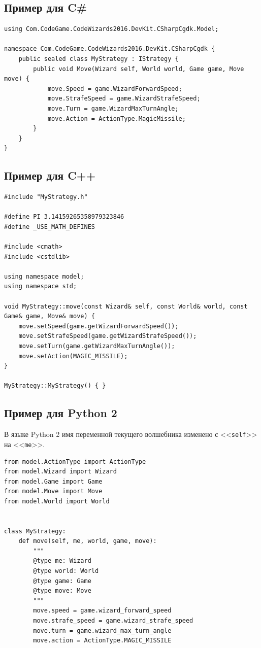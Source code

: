 \subsection{Пример для C\#}

\begin{verbatim}
using Com.CodeGame.CodeWizards2016.DevKit.CSharpCgdk.Model;

namespace Com.CodeGame.CodeWizards2016.DevKit.CSharpCgdk {
    public sealed class MyStrategy : IStrategy {
        public void Move(Wizard self, World world, Game game, Move move) {
            move.Speed = game.WizardForwardSpeed;
            move.StrafeSpeed = game.WizardStrafeSpeed;
            move.Turn = game.WizardMaxTurnAngle;
            move.Action = ActionType.MagicMissile;
        }
    }
}
\end{verbatim}

\newpage
\subsection{Пример для C++}

\begin{verbatim}
#include "MyStrategy.h"

#define PI 3.14159265358979323846
#define _USE_MATH_DEFINES

#include <cmath>
#include <cstdlib>

using namespace model;
using namespace std;

void MyStrategy::move(const Wizard& self, const World& world, const Game& game, Move& move) {
    move.setSpeed(game.getWizardForwardSpeed());
    move.setStrafeSpeed(game.getWizardStrafeSpeed());
    move.setTurn(game.getWizardMaxTurnAngle());
    move.setAction(MAGIC_MISSILE);
}

MyStrategy::MyStrategy() { }
\end{verbatim}

\newpage
\subsection{Пример для Python 2}

В языке Python 2 имя переменной текущего волшебника изменено с <<\texttt{self}>> на <<\texttt{me}>>.

\begin{verbatim}
from model.ActionType import ActionType
from model.Wizard import Wizard
from model.Game import Game
from model.Move import Move
from model.World import World


class MyStrategy:
    def move(self, me, world, game, move):
        """
        @type me: Wizard
        @type world: World
        @type game: Game
        @type move: Move
        """
        move.speed = game.wizard_forward_speed
        move.strafe_speed = game.wizard_strafe_speed
        move.turn = game.wizard_max_turn_angle
        move.action = ActionType.MAGIC_MISSILE
\end{verbatim}


